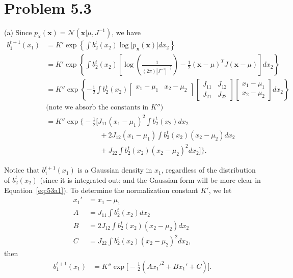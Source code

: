 \documentclass{article}
\newcommand{\bm}{\mathbf}
\begin{document}
\section*{Problem 5.3}
(a)
Since $p_{\bm{x}}(\mathbf{x}) = \mathscr{N}(\mathbf{x} | \mu, J^{-1})$, we have
\begin{align*}
	b_1^{t+1}(x_1) &= K' \exp\left\{\int b_2^{t}(x_2)
	\log\big[p_{\bm{x}}(\mathbf{x})\big]dx_2\right\} \\
	&= K' \exp\left\{\int b_2^{t}(x_2)
	\left[\log\left(\frac{1}{(2\pi)|J^{-1}|^{-\frac{1}{2}}}\right) - 
	\frac{1}{2}(\bm{x}-\mu)^T J (\bm{x}-\mu)\right]dx_2\right\}\\
	& = K''\exp\left\{-\frac{1}{2}\int b^t_2(x_2)
	\begin{bmatrix}
		x_1 - \mu_1 & x_2 - \mu_2 \\
	\end{bmatrix}
	\begin{bmatrix}
		J_{11} & J_{12} \\
		J_{21} & J_{22}
	\end{bmatrix}
	\begin{bmatrix}
		x_1 - \mu_1 \\
		x_2 - \mu_2
	\end{bmatrix}
	dx_2
\right\}\\
&\text{(note we absorb the constants in $K''$)}\\
&= K''\exp\bigg\{-\frac{1}{2}\bigg[J_{11}(x_1-\mu_1)^2 \int
b_2^t(x_2)dx_2 \\
&\;\;\;\;\;\;\;\;\;\;\;\;\;\;\;\;\;\;\;\;\;\;\;\;\;\;\;+
2J_{12}(x_1-\mu_1)\int b^t_2(x_2)(x_2-\mu_2)dx_2\\
&\;\;\;\;\;\;\;\;\;\;\;\;\;\;\;\;\;\;\;\;\;\;\;\;\;\;\;+
J_{22}\int b^t_2(x_2)(x_2-\mu_2)^2dx_2 \bigg]\bigg\}.
\end{align*}
%

Notice that $b_1^{t+1}(x_1)$ is a Gaussian density in $x_1$, regardless
of the distribution of $b_2^t(x_2)$ (since it is integrated out; and the Gaussian form will be more clear in Equation~\eqref{eq:53a1}).
%
To determine the normalization constant $K'$, we let
\begin{align*}
	x_1' &= x_1 - \mu_1 \\
	A &= J_{11}\int b_2^t(x_2)dx_2 \\
	B &= 2J_{12}\int b^t_2(x_2)(x_2-\mu_2)dx_2\\
	C & = J_{22}\int b^t_2(x_2)(x_2-\mu_2)^2dx_2,
\end{align*}
then
\begin{align}
	b_1^{t+1}(x_1) &= K''\exp\Big[-\frac{1}{2} \left(A x_1'^2 + B x_1' + C\right)\Big] \label{eq:53a1}.
\end{align}
%
\end{document}
